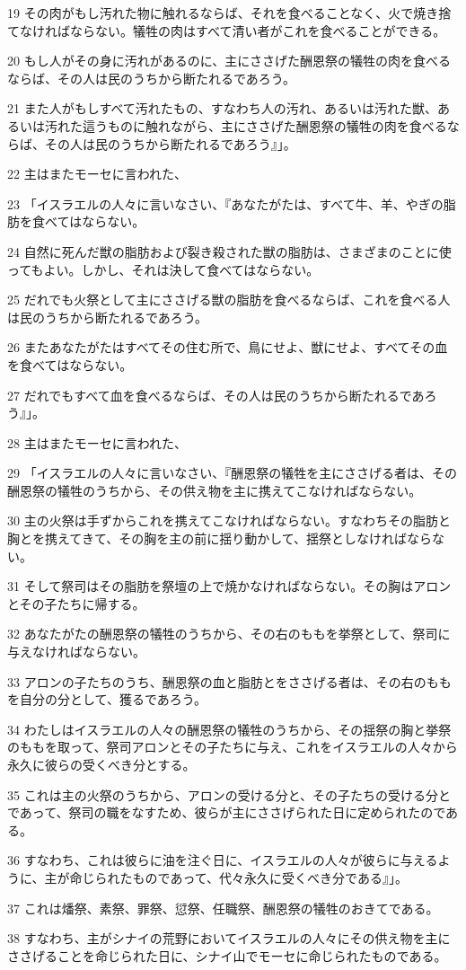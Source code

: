 \par 19 その肉がもし汚れた物に触れるならば、それを食べることなく、火で焼き捨てなければならない。犠牲の肉はすべて清い者がこれを食べることができる。
\par 20 もし人がその身に汚れがあるのに、主にささげた酬恩祭の犠牲の肉を食べるならば、その人は民のうちから断たれるであろう。
\par 21 また人がもしすべて汚れたもの、すなわち人の汚れ、あるいは汚れた獣、あるいは汚れた這うものに触れながら、主にささげた酬恩祭の犠牲の肉を食べるならば、その人は民のうちから断たれるであろう』」。
\par 22 主はまたモーセに言われた、
\par 23 「イスラエルの人々に言いなさい、『あなたがたは、すべて牛、羊、やぎの脂肪を食べてはならない。
\par 24 自然に死んだ獣の脂肪および裂き殺された獣の脂肪は、さまざまのことに使ってもよい。しかし、それは決して食べてはならない。
\par 25 だれでも火祭として主にささげる獣の脂肪を食べるならば、これを食べる人は民のうちから断たれるであろう。
\par 26 またあなたがたはすべてその住む所で、鳥にせよ、獣にせよ、すべてその血を食べてはならない。
\par 27 だれでもすべて血を食べるならば、その人は民のうちから断たれるであろう』」。
\par 28 主はまたモーセに言われた、
\par 29 「イスラエルの人々に言いなさい、『酬恩祭の犠牲を主にささげる者は、その酬恩祭の犠牲のうちから、その供え物を主に携えてこなければならない。
\par 30 主の火祭は手ずからこれを携えてこなければならない。すなわちその脂肪と胸とを携えてきて、その胸を主の前に揺り動かして、揺祭としなければならない。
\par 31 そして祭司はその脂肪を祭壇の上で焼かなければならない。その胸はアロンとその子たちに帰する。
\par 32 あなたがたの酬恩祭の犠牲のうちから、その右のももを挙祭として、祭司に与えなければならない。
\par 33 アロンの子たちのうち、酬恩祭の血と脂肪とをささげる者は、その右のももを自分の分として、獲るであろう。
\par 34 わたしはイスラエルの人々の酬恩祭の犠牲のうちから、その揺祭の胸と挙祭のももを取って、祭司アロンとその子たちに与え、これをイスラエルの人々から永久に彼らの受くべき分とする。
\par 35 これは主の火祭のうちから、アロンの受ける分と、その子たちの受ける分とであって、祭司の職をなすため、彼らが主にささげられた日に定められたのである。
\par 36 すなわち、これは彼らに油を注ぐ日に、イスラエルの人々が彼らに与えるように、主が命じられたものであって、代々永久に受くべき分である』」。
\par 37 これは燔祭、素祭、罪祭、愆祭、任職祭、酬恩祭の犠牲のおきてである。
\par 38 すなわち、主がシナイの荒野においてイスラエルの人々にその供え物を主にささげることを命じられた日に、シナイ山でモーセに命じられたものである。

